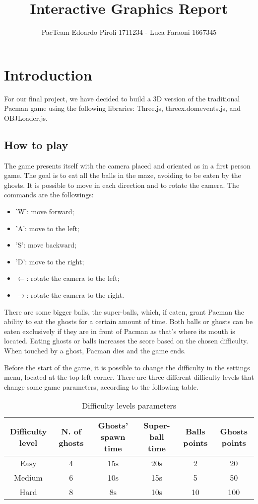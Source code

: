\documentclass[a4paper,oneside]{report}
\title{Interactive Graphics Report}
\author{PacTeam \cr Edoardo Piroli 1711234 - Luca Faraoni 1667345}
\begin{document}
\maketitle
\tableofcontents

\chapter{Introduction}

For our final project, we have decided to build a 3D version of the traditional Pacman game using the following libraries: Three.js, threex.domevents.js, and OBJLoader.js. 

\section{How to play}
The game presents itself with the camera placed and oriented as in a first person game. The goal is to eat all the balls in the maze, avoiding to be eaten by the ghosts. It is possible to move in each direction and to rotate the camera. The commands are the followings:
\begin{itemize}
\item 'W': move forward;
\item 'A': move to the left;
\item 'S': move backward;
\item 'D': move to the right;
\item $\leftarrow$: rotate the camera to the left;
\item $\rightarrow$: rotate the camera to the right.
\end{itemize}

There are some bigger balls, the super-balls, which, if eaten, grant Pacman the ability to eat the ghosts for a certain amount of time. Both balls or ghosts can be eaten exclusively if they are in front of Pacman as that's where its mouth is located. Eating ghosts or balls increases the score based on the chosen difficulty. When touched by a ghost, Pacman dies and the game ends.

Before the start of the game, it is possible to change the difficulty in the settings menu, located at the top left corner. There are three different difficulty levels that change some game parameters, according to the following table.
\begin{table}[H]
\caption{Difficulty levels parameters}
\begin{center}
\begin{tabular}{|c|c|c|c|c|c|}
\hline
\textbf{Difficulty level} & \textbf{N. of ghosts} & \textbf{Ghosts' spawn time} & \textbf{Super-ball time} & \textbf{Balls points} & \textbf{Ghosts points} \\
\hline
Easy & 4 & 15s & 20s & 2 & 20 \\
\hline
Medium & 6 & 10s & 15s & 5 & 50 \\
\hline
Hard & 8 & 8s & 10s & 10 & 100 \\
\hline
\end{tabular}
\end{center}
\end{table}
\end{document}

